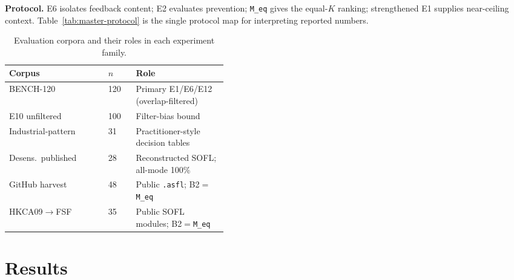 \documentclass[10pt,conference]{IEEEtran}
\newcommand{\runin}[1]{\medskip\noindent\textbf{#1}\enspace}
\begin{document}
\runin{Protocol.}
E6 isolates feedback content; E2 evaluates prevention; \texttt{M\_eq} gives
the equal-$K$ ranking; strengthened E1 supplies near-ceiling context.
Table~\ref{tab:master-protocol} is the single protocol map for interpreting
reported numbers.



\begin{table}[t]
\centering
\caption{Evaluation corpora and their roles in each experiment family.}
\label{tab:corpus}
\footnotesize
\begin{tabular}{@{}llp{0.42\linewidth}@{}}
\toprule
Corpus & $n$ & Role \\
\midrule
BENCH-120 & 120 & Primary E1/E6/E12 (overlap-filtered) \\
E10 unfiltered & 100 & Filter-bias bound \\
Industrial-pattern & 31 & Practitioner-style decision tables \\
Desens.\ published & 28 & Reconstructed SOFL; all-mode 100\% \\
GitHub harvest & 48 & Public \texttt{.asfl}; B2${=}$\texttt{M\_eq} \\
HKCA09$\rightarrow$FSF & 35 & Public SOFL modules; B2${=}$\texttt{M\_eq} \\
\bottomrule
\end{tabular}
\end{table}

\section{Results}
\end{document}
